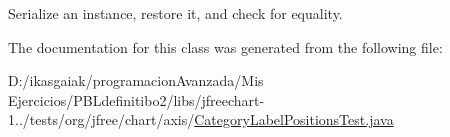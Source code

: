 Serialize an instance, restore it, and check for equality. 

The documentation for this class was generated from the following file\+:\begin{DoxyCompactItemize}
\item 
D\+:/ikasgaiak/programacion\+Avanzada/\+Mis Ejercicios/\+P\+B\+Ldefinitibo2/libs/jfreechart-\/1../tests/org/jfree/chart/axis/\mbox{\hyperlink{_category_label_positions_test_8java}{Category\+Label\+Positions\+Test.\+java}}\end{DoxyCompactItemize}
